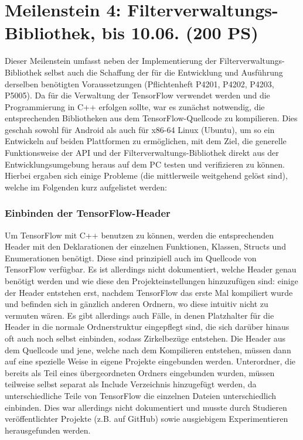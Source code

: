 \documentclass[12pt,a4paper,ngerman,enabledeprecatedfontcommands]{scrreprt}
\begin{document}
\section[Meilenstein 4: Filterverwaltungs-Bibliothek]{Meilenstein 4: Filterverwaltungs-Bibliothek, bis 10.06. (200 PS)}
Dieser Meilenstein umfasst neben der Implementierung der \gls{Filterverwaltungs-Bibliothek} selbst auch die Schaffung der für die Entwicklung und Ausführung derselben benötigten Voraussetzungen (Pflichtenheft P4201, P4202, P4203, P5005). Da für die Verwaltung der  TensorFlow verwendet werden und die Programmierung in C++ erfolgen sollte, war es zunächst notwendig, die entsprechenden Bibliotheken aus dem TensorFlow-Quellcode zu kompilieren. Dies geschah sowohl für Android als auch für x86-64 Linux (Ubuntu), um so ein Entwickeln auf beiden Plattformen zu ermöglichen, mit dem Ziel, die generelle Funktionsweise der \gls{API} und der \gls{Filterverwaltungs-Bibliothek} direkt aus der Entwicklungsumgebung heraus auf dem PC testen und verifizieren zu können. 
Hierbei ergaben sich einige Probleme (die mittlerweile weitgehend gelöst sind), welche im Folgenden kurz aufgelistet werden:\\

\subsubsection{Einbinden der TensorFlow-Header}
Um TensorFlow mit C++ benutzen zu können, werden die entsprechenden Header mit den Deklarationen der einzelnen Funktionen, Klassen, Structs und Enumerationen benötigt. Diese sind prinzipiell auch im Quellcode von TensorFlow verfügbar. Es ist allerdings nicht dokumentiert, welche Header genau benötigt werden und wie diese den Projekteinstellungen hinzuzufügen sind: einige der Header entstehen erst, nachdem TensorFlow das erste Mal kompiliert wurde und befinden sich in gänzlich anderen Ordnern, wo diese intuitiv nicht zu vermuten wären. Es gibt allerdings auch Fälle, in denen Platzhalter für die Header in die normale Ordnerstruktur eingepflegt sind, die sich darüber hinaus oft auch noch selbst einbinden, sodass Zirkelbezüge entstehen. Die Header aus dem Quellcode und jene, welche nach dem Kompilieren entstehen, müssen dann auf eine spezielle Weise in eigene Projekte eingebunden werden. Unterordner, die bereits als Teil eines übergeordneten Ordners eingebunden wurden, müssen teilweise selbst separat als \glqq{}Include Verzeichnis\grqq{} hinzugefügt werden, da unterschiedliche Teile von TensorFlow die einzelnen Dateien unterschiedlich einbinden. Dies war allerdings nicht dokumentiert und musste durch Studieren veröffentlichter Projekte (z.B. auf GitHub) sowie ausgiebigem Experimentieren herausgefunden werden.\\
\end{document}
